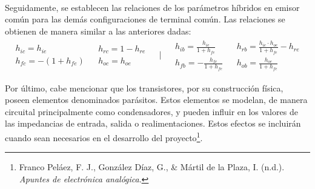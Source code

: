 \paragraph{}
Seguidamente, se establecen las relaciones de los parámetros híbridos en emisor com\'un para las demás configuraciones de terminal común. Las relaciones se obtienen de manera similar a las anteriores dadas:
   \begin{equation} \label{eq:h_conversion}
\begin{array}{rrcll} 
      \begin{array}{l}
	 h_{ic} = h_{ie} \\
	 h_{fc} = - (1+ h_{fe} )
      \end{array}
      &
      \begin{array}{l}
	 h_{rc} = 1 - h_{re} \\
	 h_{oc} = h_{oe}
      \end{array}
      &
      \begin{array}{l}
	 \bigg|
      \end{array}
      &
      \begin{array}{l}
	 h_{ib} = \frac{h_{ie}}{1+h_{fe}} \\
	 h_{fb} = -\frac{h_{fe}}{1+h_{fe}} 
      \end{array}
      &
      \begin{array}{l}
	 h_{rb} = \frac{h_{ie} \cdot h_{oe}}{1+h_{fe}} - h_{re}\\
	 h_{ob} = \frac{h_{oe}}{1+h_{fe}} 
      \end{array}
\end{array}
   \end{equation}

Por último, cabe mencionar que los transistores, por su construcción física, poseen elementos denominados parásitos. Estos elementos se modelan, de manera circuital principalmente como condensadores, y pueden influir en los valores de las impedancias de entrada, salida o realimentaciones. Estos efectos se incluirán cuando sean necesarios en el desarrollo del proyecto\footnote{Franco Peláez, F. J., González Díaz, G., & Mártil de la Plaza, I. (n.d.). \textit{Apuntes de electrónica analógica}.}.
